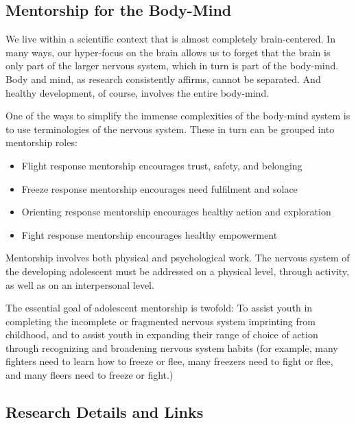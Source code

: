 \documentclass[12pt,DIV9,oneside,headsepline,footsepline]{scrreprt}
\begin{document}
\subsection{Mentorship for the Body-Mind}

We live within a scientific context that is almost completely
brain-centered. In many ways, our hyper-focus on the brain allows us
to forget that the brain is only part of the larger nervous system,
which in turn is part of the body-mind. Body and mind, as research
consistently affirms, cannot be separated. And healthy development, of
course, involves the entire body-mind.

One of the ways to simplify the immense complexities of the body-mind
system is to use terminologies of the nervous system. These in turn
can be grouped into mentorship roles:

\begin{itemize}
\item Flight response mentorship encourages trust, safety, and
  belonging
\item Freeze response mentorship encourages need fulfilment and solace
\item Orienting response mentorship encourages healthy action and
  exploration 
\item Fight response mentorship encourages healthy empowerment
\end{itemize}

Mentorship involves both physical and psychological work. The nervous
system of the developing adolescent must be addressed on a physical
level, through activity, as well as on an interpersonal level.

The essential goal of adolescent mentorship is twofold: To assist
youth in completing the incomplete or fragmented nervous system
imprinting from childhood, and to assist youth in expanding their
range of choice of action through recognizing and broadening nervous
system habits (for example, many fighters need to learn how to freeze
or flee, many freezers need to fight or flee, and many fleers need to
freeze or fight.)

\subsection{Research Details and Links}
\end{document}
